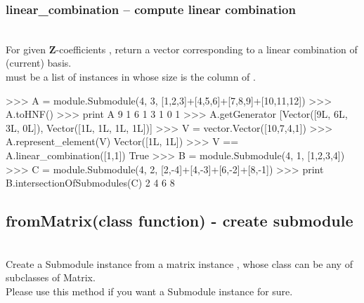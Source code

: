  \subsubsection{linear\_combination -- compute linear combination}
   \\
   \spacing
   \quad For given $\mathbf{Z}$-coefficients , 
         return a vector corresponding to a linear combination of (current) basis.\\
   \spacing
   \quad {} must be a list of instances in  whose size is the column of .
\begin{ex}
>>> A = module.Submodule(4, 3, [1,2,3]+[4,5,6]+[7,8,9]+[10,11,12])
>>> A.toHNF()
>>> print A
9 1
6 1
3 1
0 1
>>> A.getGenerator
[Vector([9L, 6L, 3L, 0L]), Vector([1L, 1L, 1L, 1L])]
>>> V = vector.Vector([10,7,4,1])
>>> A.represent_element(V)
Vector([1L, 1L])
>>> V == A.linear_combination([1,1])
True
>>> B = module.Submodule(4, 1, [1,2,3,4])
>>> C = module.Submodule(4, 2, [2,-4]+[4,-3]+[6,-2]+[8,-1])
>>> print B.intersectionOfSubmodules(C)
2
4
6
8
\end{ex}%
\C
  \subsection{fromMatrix(class function) - create submodule}
  \\
   \spacing
   \quad Create a Submodule instance from a matrix instance , whose class can be any of subclasses of Matrix.\\
   \spacing
   \quad Please use this method if you want a Submodule instance for sure.\\
   \spacing
\C

